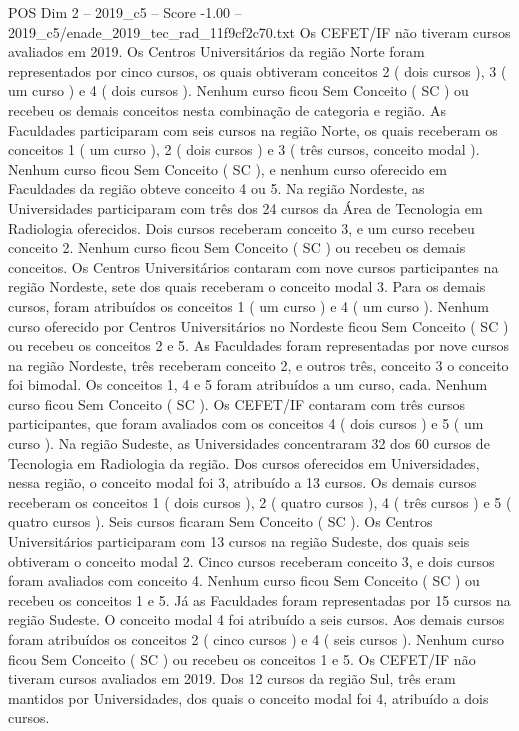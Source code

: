 \begin{textsample}{POS Dim 2 – 2019\_c5 – Score -1.00 – 2019\_c5/enade\_2019\_tec\_rad\_11f9cf2c70.txt}
Os CEFET/IF não tiveram cursos avaliados em 2019.
Os Centros Universitários da região Norte foram representados por cinco cursos, os quais obtiveram conceitos 2 ( dois cursos ), 3 ( um curso ) e 4 ( dois cursos ).
Nenhum curso ficou Sem Conceito ( SC ) ou recebeu os demais conceitos nesta combinação de categoria e região.
As Faculdades participaram com seis cursos na região Norte, os quais receberam os conceitos 1 ( um curso ), 2 ( dois cursos ) e 3 ( três cursos, conceito modal ).
Nenhum curso ficou Sem Conceito ( SC ), e nenhum curso oferecido em Faculdades da região obteve conceito 4 ou 5.
Na região Nordeste, as Universidades participaram com três dos 24 cursos da Área de Tecnologia em Radiologia oferecidos.
Dois cursos receberam conceito 3, e um curso recebeu conceito 2.
Nenhum curso ficou Sem Conceito ( SC ) ou recebeu os demais conceitos.
Os Centros Universitários contaram com nove cursos participantes na região Nordeste, sete dos quais receberam o conceito modal 3.
Para os demais cursos, foram atribuídos os conceitos 1 ( um curso ) e 4 ( um curso ).
Nenhum curso oferecido por Centros Universitários no Nordeste ficou Sem Conceito ( SC ) ou recebeu os conceitos 2 e 5.
As Faculdades foram representadas por nove cursos na região Nordeste, três receberam conceito 2, e outros três, conceito 3 o conceito foi bimodal.
Os conceitos 1, 4 e 5 foram atribuídos a um curso, cada.
Nenhum curso ficou Sem Conceito ( SC ).
Os CEFET/IF contaram com três cursos participantes, que foram avaliados com os conceitos 4 ( dois cursos ) e 5 ( um curso ).
Na região Sudeste, as Universidades concentraram 32 dos 60 cursos de Tecnologia em Radiologia da região.
Dos cursos oferecidos em Universidades, nessa região, o conceito modal foi 3, atribuído a 13 cursos.
Os demais cursos receberam os conceitos 1 ( dois cursos ), 2 ( quatro cursos ), 4 ( três cursos ) e 5 ( quatro cursos ).
Seis cursos ficaram Sem Conceito ( SC ).
Os Centros Universitários participaram com 13 cursos na região Sudeste, dos quais seis obtiveram o conceito modal 2.
Cinco cursos receberam conceito 3, e dois cursos foram avaliados com conceito 4.
Nenhum curso ficou Sem Conceito ( SC ) ou recebeu os conceitos 1 e 5.
Já as Faculdades foram representadas por 15 cursos na região Sudeste.
O conceito modal 4 foi atribuído a seis cursos.
Aos demais cursos foram atribuídos os conceitos 2 ( cinco cursos ) e 4 ( seis cursos ).
Nenhum curso ficou Sem Conceito ( SC ) ou recebeu os conceitos 1 e 5.
Os CEFET/IF não tiveram cursos avaliados em 2019.
Dos 12 cursos da região Sul, três eram mantidos por Universidades, dos quais o conceito modal foi 4, atribuído a dois cursos.

\end{textsample}
